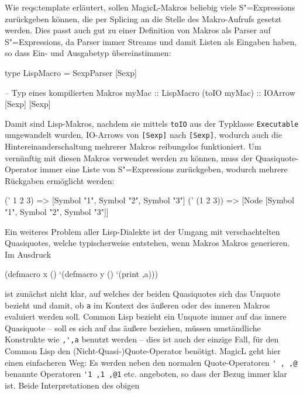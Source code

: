 \documentclass[12pt, a4paper, bibgerm]{scrbook}
\newenvironment{DIFnomarkup}{}{}
\newcommand\icode[1]{\lstinline?#1?}
\newcommand\sref{}
\newcommand{\sexps}{S"=Expressions}
\begin{document}
Wie \sref{reqs:template} erläutert, sollen MagicL-Makros beliebig viele
\sexps{} zurückgeben können, die per Splicing an die Stelle des
Makro-Aufrufs gesetzt werden. Dies passt auch gut zu einer Definition
von Makros als Parser auf \sexps{}, da Parser immer Streams und damit
Listen als Eingaben haben, so dass Ein- und Ausgabetyp übereinstimmen:
\begin{DIFnomarkup}\begin{code}
type LispMacro = SexpParser [Sexp]

-- Typ eines kompilierten Makros
myMac        :: LispMacro
(toIO myMac) :: IOArrow [Sexp] [Sexp]
\end{code}\end{DIFnomarkup}
Damit sind Lisp-Makros, nachdem sie mittels \icode{toIO} aus der Typklasse
\icode{Executable} umgewandelt wurden, IO-Arrows von \icode{[Sexp]} nach
\icode{[Sexp]}, wodurch auch die Hintereinanderschaltung mehrerer
Makros reibungslos funktioniert. Um vernünftig mit diesen Makros
verwendet werden zu können, muss der Quasiquote-Operator immer eine
Liste von \sexps{} zurückgeben, wodurch mehrere Rückgaben ermöglicht
werden:
\begin{DIFnomarkup}\begin{code}
(' 1 2 3)     =>   [Symbol "1", Symbol "2", Symbol "3"]
(' (1 2 3))   =>   [Node [Symbol "1", Symbol "2", Symbol "3"]]
\end{code}\end{DIFnomarkup}
Ein weiteres Problem aller Lisp-Dialekte ist der Umgang mit
verschachtelten Quasiquotes, welche typischerweise entstehen, wenn
Makros Makros generieren. Im Ausdruck
\begin{DIFnomarkup}\begin{code}
(defmacro x ()
  `(defmacro y ()
     `(print ,a)))
\end{code}\end{DIFnomarkup}
ist zunächst nicht klar, auf welches der beiden Quasiquotes sich das Unquote
bezieht und damit, ob \icode{a} im Kontext des äußeren oder des inneren
Makros evaluiert werden soll. Common Lisp bezieht ein Unquote immer auf
das innere Quasiquote -- soll es sich auf das äußere beziehen, müssen
umständliche Konstrukte wie \icode{,',a} benutzt werden -- dies ist auch
der einzige Fall, für den Common Lisp den (Nicht-Quasi-)Quote-Operator
benötigt. MagicL geht hier einen einfacheren Weg: Es werden neben den
normalen Quote-Operatoren \icode{' , ,@} benannte
Operatoren \icode{'1 ,1 ,@1} etc. angeboten,
so dass der Bezug immer klar ist. Beide Interpretationen des obigen
\end{document}

